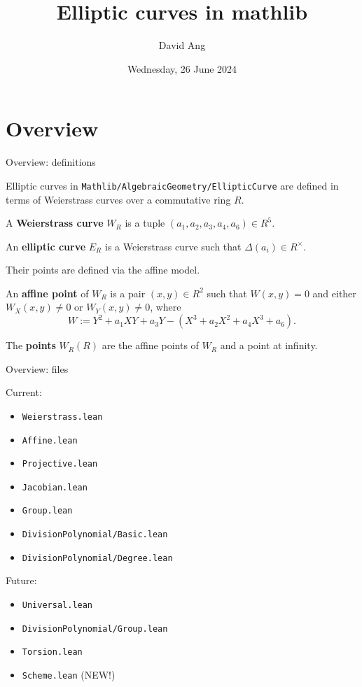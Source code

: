 \documentclass[10pt]{beamer}
\title{Elliptic curves in mathlib}
\author{David Ang}
\institute{London School of Geometry and Number Theory}
\date{Wednesday, 26 June 2024}
\begin{document}
\frame{\titlepage}

\section{Overview}

\begin{frame}[t]{Overview: definitions}

Elliptic curves in \texttt{Mathlib/AlgebraicGeometry/EllipticCurve} are defined in terms of Weierstrass curves over a commutative ring $ R $.

\begin{definition}
A \textbf{Weierstrass curve} $ W_R $ is a tuple $ (a_1, a_2, a_3, a_4, a_6) \in R^5 $.

An \textbf{elliptic curve} $ E_R $ is a Weierstrass curve such that $ \Delta(a_i) \in R^\times $.
\end{definition}

\pause

Their points are defined via the affine model.

\begin{definition}
An \textbf{affine point} of $ W_R $ is a pair $ (x, y) \in R^2 $ such that $ W(x, y) = 0 $ and either $ W_X(x, y) \ne 0 $ or $ W_Y(x, y) \ne 0 $, where
$$ W := Y^2 + a_1XY + a_3Y - (X^3 + a_2X^2 + a_4X^3 + a_6). $$

The \textbf{points} $ W_R(R) $ are the affine points of $ W_R $ and a point at infinity.
\end{definition}

\end{frame}

\begin{frame}[t]{Overview: files}

Current:
\begin{itemize}
\item \texttt{Weierstrass.lean}
\item \texttt{Affine.lean}
\item \texttt{Projective.lean}
\item \texttt{Jacobian.lean}
\item \texttt{Group.lean}
\item \texttt{DivisionPolynomial/Basic.lean}
\item \texttt{DivisionPolynomial/Degree.lean}
\end{itemize}

Future:
\begin{itemize}
\item \texttt{Universal.lean}
\item \texttt{DivisionPolynomial/Group.lean}
\item \texttt{Torsion.lean}
\item \texttt{Scheme.lean} (NEW!)
\end{itemize}

\end{frame}
\end{document}
